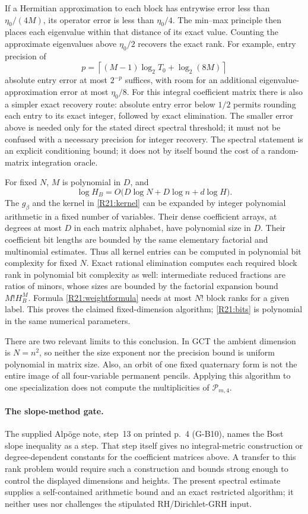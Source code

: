If a Hermitian approximation to each block has entrywise error
less than $\eta_0/(4M)$, its operator error is less than
$\eta_0/4$. The min--max principle then places each eigenvalue
within that distance of its exact value. Counting the approximate
eigenvalues above $\eta_0/2$ recovers the exact rank. For example,
entry precision of
\begin{equation}\label{R21:bits}
 p=\left\lceil (M-1)\log_2T_0+\log_2(8M)\right\rceil
\end{equation}
absolute entry error at most $2^{-p}$ suffices, with room for an
additional eigenvalue-approximation error at most $\eta_0/8$. For this integral coefficient matrix there is also a simpler exact
recovery route: absolute entry error below $1/2$ permits rounding each
entry to its exact integer, followed by exact elimination. The smaller
error above is needed only for the stated direct spectral threshold;
it must not be confused with a necessary precision for integer recovery.
The spectral statement is an explicit conditioning bound; it does not by itself bound the cost of a
random-matrix integration oracle.

For fixed $N$, $M$ is polynomial in $D$, and
\[
 \log H_B=O\bigl(D\log N+D\log n+d\log H\bigr).
\]
The $g_\beta$ and the kernel in \eqref{R21:kernel} can be expanded
by integer polynomial arithmetic in a fixed number of variables.
Their dense coefficient arrays, at degrees at most $D$ in each
matrix alphabet, have polynomial size in $D$.
Their coefficient bit lengths are bounded by the same elementary
factorial and multinomial estimates. Thus all kernel entries can
be computed in polynomial bit complexity for fixed $N$.
Exact rational elimination computes each required block rank in
polynomial bit complexity as well: intermediate reduced fractions
are ratios of minors, whose sizes are bounded by the factorial
expansion bound $M!H_B^M$. Formula \eqref{R21:weightformula} needs
at most $N!$ block ranks for a given label. This proves the claimed
fixed-dimension algorithm; \eqref{R21:bits} is polynomial in the
same numerical parameters.

There are two relevant limits to this conclusion. In GCT the ambient
dimension is $N=n^2$, so neither the size exponent nor the precision
bound is uniform polynomial in matrix size. Also, an orbit of one
fixed quaternary form is not the entire image of all four-variable
permanent pencils. Applying this algorithm to one specialization
does not compute the multiplicities of $\mathcal P_{m,4}$.

\paragraph{The slope-method gate.}
The supplied Alp\"oge note, step~13 on printed p.~4 (G-B10), names
the Bost slope inequality as a step. That step itself gives no integral-metric construction or
degree-dependent constants for the coefficient matrices above. A transfer to this rank problem would require such
a construction and bounds strong enough to control the displayed
dimensions and heights. The present spectral estimate supplies a
self-contained arithmetic bound and an exact restricted algorithm;
it neither uses nor challenges the stipulated RH/Dirichlet-GRH input.

